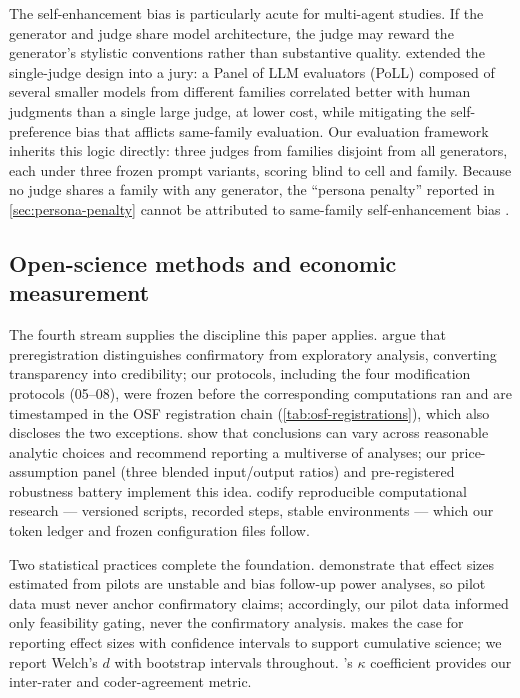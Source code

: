 \documentclass[12pt,a4paper]{article}
\begin{document}
The self-enhancement bias is particularly acute for multi-agent studies. If the
generator and judge share model architecture, the judge may reward the
generator's stylistic conventions rather than substantive quality.
\citet{VergaEtAl2024} extended the single-judge design into a jury: a Panel of
LLM evaluators (PoLL) composed of several smaller models from different
families correlated better with human judgments than a single large judge, at
lower cost, while mitigating the self-preference bias that afflicts same-family
evaluation. Our evaluation framework inherits this logic directly: three judges
from families disjoint from all generators, each under three frozen prompt
variants, scoring blind to cell and family. Because no judge shares a family with any generator, the ``persona penalty'' reported in \cref{sec:persona-penalty} cannot be attributed to same-family self-enhancement bias \citep{ZhengEtAl2023}.

\subsection{Open-science methods and economic measurement}
The fourth stream supplies the discipline this paper applies. \citet{NosekEtAl2018}
argue that preregistration distinguishes confirmatory from exploratory
analysis, converting transparency into credibility; our protocols, including
the four modification protocols (05--08), were frozen before the corresponding computations ran and are
timestamped in the OSF registration chain (\cref{tab:osf-registrations}), which
also discloses the two exceptions.
\citet{SteegenEtAl2016} show that conclusions can vary across reasonable
analytic choices and recommend reporting a multiverse of analyses; our
price-assumption panel (three blended input/output ratios) and pre-registered
robustness battery implement this idea. \citet{SandveEtAl2013} codify
reproducible computational research --- versioned scripts, recorded steps,
stable environments --- which our token ledger and frozen configuration files
follow.

Two statistical practices complete the foundation. \citet{AlbersLakens2018}
demonstrate that effect sizes estimated from pilots are unstable and bias
follow-up power analyses, so pilot data must never anchor confirmatory claims;
accordingly, our pilot data informed only feasibility gating, never the
confirmatory analysis. \citet{Lakens2013} makes the case for reporting effect sizes with
confidence intervals to support cumulative science; we report Welch's $d$ with
bootstrap intervals throughout. \citet{Cohen1960}'s $\kappa$ coefficient
provides our inter-rater and coder-agreement metric.
\end{document}
